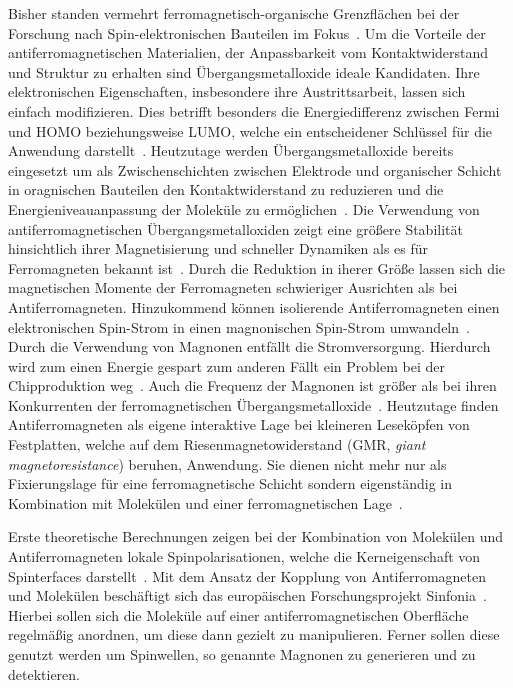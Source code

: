     Bisher standen vermehrt ferromagnetisch-organische Grenzflächen bei der Forschung nach Spin-elektronischen Bauteilen im Fokus~\cite{ma-DJ}.
    Um die Vorteile der antiferromagnetischen Materialien, der Anpassbarkeit vom Kontaktwiderstand und Struktur zu erhalten sind Übergangsmetalloxide ideale Kandidaten.
    Ihre elektronischen Eigenschaften, insbesondere ihre Austrittsarbeit, lassen sich einfach modifizieren.
    Dies betrifft besonders die Energiedifferenz zwischen Fermi und HOMO beziehungsweise LUMO, welche ein entscheidener Schlüssel für die Anwendung darstellt~\cite{5A_4}.
    Heutzutage werden Übergangsmetalloxide bereits eingesetzt um als Zwischenschichten zwischen Elektrode und organischer Schicht in oragnischen Bauteilen den Kontaktwiderstand zu reduzieren und die Energieniveauanpassung der Moleküle zu ermöglichen~\cite{IF_11}.
    Die Verwendung von antiferromagnetischen Übergangsmetalloxiden zeigt eine größere Stabilität hinsichtlich ihrer Magnetisierung und schneller Dynamiken als es für Ferromagneten bekannt ist~\cite{AFM_1}.
    Durch die Reduktion in iherer Größe lassen sich die magnetischen Momente der Ferromagneten schwieriger Ausrichten als bei Antiferromagneten.
    Hinzukommend können isolierende Antiferromagneten einen elektronischen Spin-Strom in einen magnonischen Spin-Strom umwandeln~\cite{AFM_1}.
    Durch die Verwendung von Magnonen entfällt die Stromversorgung.
    Hierdurch wird zum einen Energie gespart zum anderen Fällt ein Problem bei der Chipproduktion weg~\cite{AFM_3}.
    Auch die Frequenz der Magnonen ist größer als bei ihren Konkurrenten der ferromagnetischen Übergangsmetalloxide~\cite{AFM_5}.
    Heutzutage finden Antiferromagneten als eigene interaktive Lage bei kleineren Leseköpfen von Festplatten, welche auf dem Riesenmagnetowiderstand (GMR, \textit{giant magnetoresistance}) beruhen, Anwendung.
    Sie dienen nicht mehr nur als Fixierungslage für eine ferromagnetische Schicht sondern eigenständig in Kombination mit Molekülen und einer ferromagnetischen Lage~\cite{bagrets_single_2012}.

    Erste theoretische Berechnungen zeigen bei der Kombination von Molekülen und Antiferromagneten lokale Spinpolarisationen, welche die Kerneigenschaft von Spinterfaces darstellt~\cite{AFM_2}.
    Mit dem Ansatz der Kopplung von Antiferromagneten und Molekülen beschäftigt sich das europäischen Forschungsprojekt Sinfonia~\cite{SINFONIA}.
    Hierbei sollen sich die Moleküle auf einer antiferromagnetischen Oberfläche regelmäßig anordnen, um diese dann gezielt zu manipulieren.
    Ferner sollen diese genutzt werden um Spinwellen, so genannte Magnonen zu generieren und zu detektieren.


